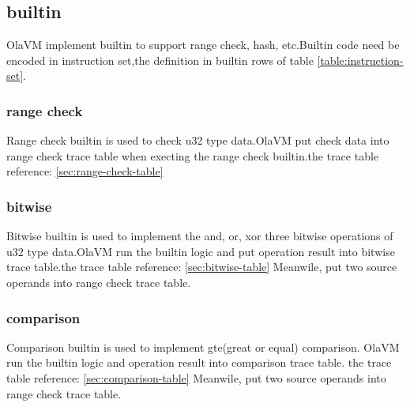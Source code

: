 \subsection{builtin}\label{subsec: instructions-builtin}
OlaVM implement builtin to support range check, hash, etc.Builtin code need be encoded in instruction set,the definition in builtin rows of table \ref{table:instruction-set}.

\subsubsection{range check}
Range check builtin is used to check u32 type data.OlaVM put check data into range check trace table when execting the range check builtin.the trace table reference: \ref{sec:range-check-table}

\subsubsection{bitwise}
Bitwise builtin is used to implement the and, or, xor three bitwise operations of u32 type data.OlaVM run the builtin logic and put operation result into bitwise trace table.the trace table reference: \ref{sec:bitwise-table}
Meanwile, put two source operands into range check trace table.

\subsubsection{comparison}
Comparison builtin is used to implement gte(great or equal) comparison. OlaVM run the builtin logic and operation result into comparison trace table. the trace table reference: \ref{sec:comparison-table}
Meanwile, put two source operands into range check trace table.